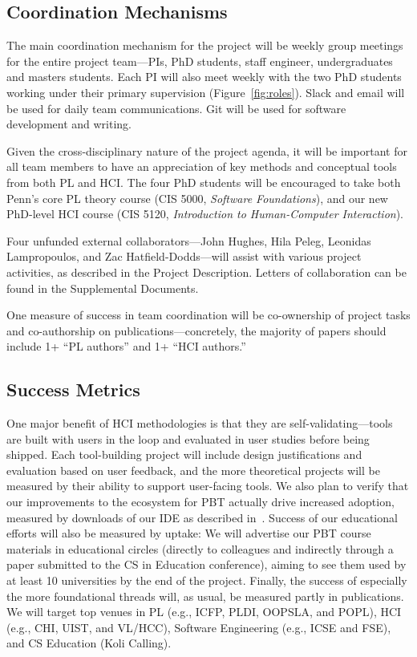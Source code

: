 \subsection*{Coordination Mechanisms}

The main coordination mechanism for the project will be weekly group
meetings for the entire project team---PIs, PhD students, staff
engineer, undergraduates and masters students.
%
Each PI will also meet weekly with the two PhD students working under
their primary supervision (Figure~\ref{fig:roles}).
%
Slack and email will be used for daily team communications.  Git will
be used for software development and writing.

Given the cross-disciplinary nature of the project agenda, it will be
important for all team members to have an appreciation of key methods
and conceptual tools from both PL and HCI.  The four PhD students will
be encouraged to take both Penn's core PL theory course (CIS 5000,
{\em Software Foundations}), and our new PhD-level HCI course (CIS
5120, {\em Introduction to Human-Computer Interaction}).

Four unfunded external collaborators---John Hughes, Hila Peleg,
Leonidas Lampropoulos, and Zac Hatfield-Dodds---will assist with
various project activities, as described in the Project Description.
Letters of collaboration can be found in the Supplemental Documents.

One measure of success in team coordination will be co-ownership of
project tasks and co-authorship on publications---concretely, the
majority of papers should include 1+ ``PL authors''
and 1+ ``HCI authors.''

\subsection*{Success Metrics}

One major benefit of
HCI methodologies is that they are self-validating---tools are built with users
in the loop and evaluated in user studies before being shipped.
Each tool-building project will include design justifications and
evaluation based on user feedback, and the more theoretical
projects will be measured by their ability to support user-facing tools.
%
We also plan to verify that our improvements to the ecosystem for PBT
actually drive increased adoption, measured by
downloads of our \tyche{} IDE as described in~.
%
Success of our educational efforts will also be measured by uptake: We
will advertise our PBT course materials in educational circles
(directly to colleagues and indirectly through a paper
submitted to the CS in Education conference), aiming to see them used
by at least 10 universities by the end of the project.
%
Finally, the
success of especially the more foundational threads will, as usual, be measured
partly in publications.  We will target top venues in PL (e.g., ICFP, PLDI,
OOPSLA, and POPL), HCI (e.g., CHI, UIST, and VL/HCC), Software Engineering
(e.g., ICSE and FSE), and CS Education (Koli Calling).

\clearpage
